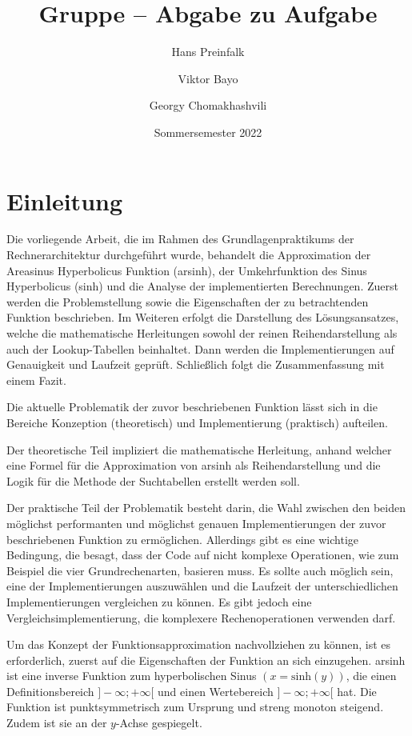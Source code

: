 \documentclass[course=erap]{aspdoc}
\author{Hans Preinfalk \and Viktor Bayo \and Georgy Chomakhashvili}
\date{Sommersemester 2022} %
\title{Gruppe \theGroup{} -- Abgabe zu Aufgabe \theNumber}
\begin{document}
 \maketitle
 
 \section{Einleitung}
 
 
Die vorliegende Arbeit, die im Rahmen des Grundlagenpraktikums der Rechnerarchitektur durchgeführt wurde, behandelt die Approximation der Areasinus Hyperbolicus Funktion (arsinh), der Umkehrfunktion des Sinus Hyperbolicus (sinh) und die Analyse der implementierten Berechnungen. Zuerst werden die Problemstellung sowie die Eigenschaften der zu betrachtenden Funktion beschrieben. Im Weiteren erfolgt die Darstellung des Lösungsansatzes, welche die mathematische Herleitungen sowohl der reinen Reihendarstellung als auch der Lookup-Tabellen beinhaltet. Dann werden die Implementierungen auf Genauigkeit und Laufzeit geprüft. Schließlich folgt die Zusammenfassung mit einem Fazit.

Die aktuelle Problematik der zuvor beschriebenen Funktion lässt sich in die Bereiche Konzeption (theoretisch) und Implementierung (praktisch) aufteilen.

Der theoretische Teil impliziert die mathematische Herleitung, anhand welcher eine Formel für die Approximation von arsinh als Reihendarstellung und die Logik für die Methode der Suchtabellen erstellt werden soll.

Der praktische Teil der Problematik besteht darin, die Wahl zwischen den beiden möglichst performanten und möglichst genauen Implementierungen der zuvor beschriebenen Funktion zu ermöglichen. Allerdings gibt es eine wichtige Bedingung, die besagt, dass der Code auf nicht komplexe Operationen, wie zum Beispiel die vier Grundrechenarten, basieren muss. Es sollte auch möglich sein, eine der Implementierungen auszuwählen und die Laufzeit der unterschiedlichen Implementierungen vergleichen zu können. Es gibt jedoch eine Vergleichsimplementierung, die komplexere Rechenoperationen verwenden darf.

Um das Konzept der Funktionsapproximation nachvollziehen zu können, ist es erforderlich, zuerst auf die Eigenschaften der Funktion an sich einzugehen. arsinh ist eine inverse Funktion zum hyperbolischen Sinus $(x = \text{sinh}(y))$, die einen Definitionsbereich $]-\infty;+\infty[$ und einen Wertebereich $]-\infty;+\infty[$ hat. Die Funktion ist punktsymmetrisch zum Ursprung und streng monoton steigend. Zudem ist sie an der $y$-Achse gespiegelt.
\end{document}
